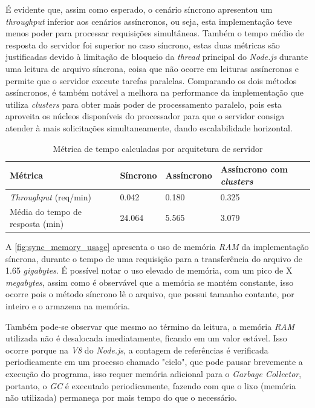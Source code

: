 \documentclass[12pt]{article}
\begin{document}
É evidente que, assim como
esperado, o cenário síncrono apresentou um \textit{throughput} inferior aos cenários assíncronos, ou seja, esta implementação
teve menos poder para processar requisições simultâneas. Também o tempo médio de resposta do servidor foi superior no caso
síncrono, estas duas métricas são justificadas devido à limitação de bloqueio da \textit{thread} principal do 
\textit{Node.js} durante uma leitura de arquivo síncrona, coisa que não ocorre em leituras assíncronas e permite que o
servidor execute tarefas paralelas. Comparando os dois métodos assíncronos, é também notável a melhora na performance da 
implementação que utiliza \textit{clusters} para obter mais poder de processamento paralelo, pois esta aproveita
os núcleos disponíveis do processador para que o servidor consiga atender à mais solicitações simultaneamente,
dando escalabilidade horizontal.

\begin{table}[!h]
\centering
\caption{Métrica de tempo calculadas por arquitetura de servidor} 
\label{tab:metrics}
\begin{tabular}{|p{3cm}|p{3cm}|p{3cm}|p{3cm}|}
\hline
\textbf{Métrica} & \textbf{Síncrono} & \textbf{Assíncrono} & \textbf{Assíncrono com \textit{clusters}} \\
\hline
\textit{Throughput} (req/min) & 0.042 & 0.180 & 0.325\\
\hline
Média do tempo de resposta (min) & 24.064 & 5.565 & 3.079\\
\hline
\end{tabular}
\end{table}


A \autoref{fig:sync_memory_usage} apresenta o uso de memória \textit{RAM} da implementação síncrona,
durante o tempo de uma requisição para a transferência do arquivo de 1.65 \textit{gigabytes}. É 
possível notar o uso elevado de memória, com um pico de X \textit{megabytes}, assim como é observável
que a memória se mantém constante, isso ocorre pois o método síncrono lê o arquivo, que possui
tamanho contante, por inteiro e o armazena na memória.

Também pode-se observar que mesmo ao término da leitura,
a memória \textit{RAM} utilizada não é desalocada imediatamente, ficando em um valor estável.
Isso ocorre porque na \textit{V8} do \textit{Node.js}, a contagem de referências é verificada periodicamente em um
processo chamado "ciclo", que pode pausar brevemente a execução do programa, isso requer memória 
adicional para o \textit{Garbage Collector}, portanto, o \textit{GC} é executado periodicamente,
fazendo com que o lixo (memória não utilizada) permaneça por mais tempo do que o necessário. \cite[p. 35]{DIOGORESENDE}
\end{document}
